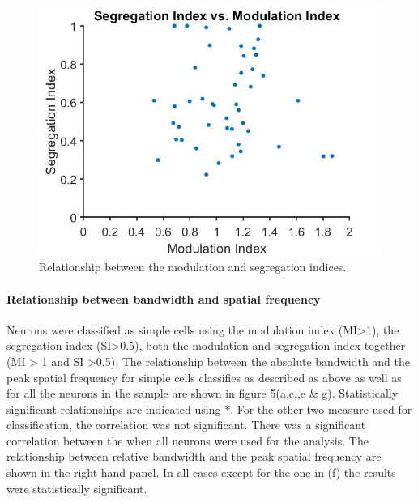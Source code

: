 	
	\begin{figure}[H]
		
		\includegraphics[width=\linewidth]{LinearV1/Segindvsmodind.jpg}
		\caption{Relationship between the modulation and segregation indices.}
		\label{fig:fig5}
	\end{figure}

	\paragraph{Relationship between bandwidth and spatial frequency}
	
	Neurons were classified as simple cells using the modulation index (MI>1), the segregation index (SI>0.5), both the modulation and segregation index together (MI > 1 and SI >0.5). The relationship between the absolute bandwidth and the peak spatial frequency for simple cells classifies as described as above as well as for all the neurons in the sample are shown in figure 5(a,c,,e \& g). Statistically significant relationships are indicated using $*$. For the other two measure used for classification, the correlation was not significant. There was a significant correlation between the when all neurons were used for the analysis. The relationship between relative bandwidth and the peak spatial frequency are shown in the right hand panel. In all cases except for the one in (f) the results were statistically significant.
	
